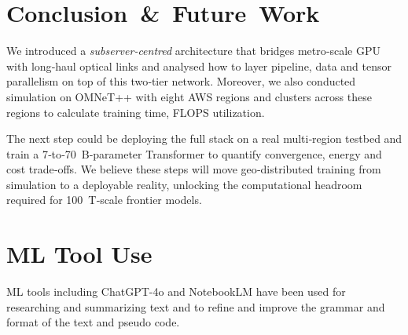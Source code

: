 \documentclass{article}
\begin{document}
\section{Conclusion \& Future Work}\label{sec:conclusion}

We introduced a \emph{subserver‑centred} architecture that bridges metro‑scale GPU with long‑haul optical links and analysed how to layer pipeline, data and tensor parallelism on top of this two‑tier network.  Moreover, we also conducted simulation on OMNeT++ with eight AWS regions and clusters across these regions to calculate training time, FLOPS utilization.


The next step could be deploying the full stack on a real multi‑region testbed and train a 7‑to‑70 B‑parameter Transformer to quantify convergence, energy and cost trade‑offs. We believe these steps will move geo‑distributed training from simulation to a deployable reality, unlocking the computational headroom required for \SI{100}{T}‑scale frontier models.



% 

\section*{ML Tool Use}

ML tools including ChatGPT-4o and NotebookLM have been used for researching and summarizing text and to refine and improve the grammar and format of the text and pseudo code.

\printbibliography
\end{document}
